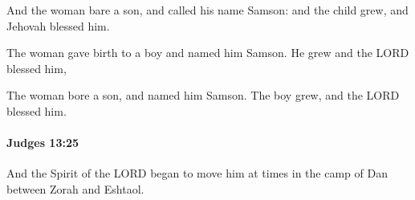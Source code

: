 			\begin{versebox}
					\item[BHS] 
					\item[ASV] And the woman bare a son, and called his name Samson: and the child grew, and Jehovah blessed him.
					\item[NIV] The woman gave birth to a boy and named him Samson. He grew and the LORD blessed him,
					\item[NRSV] The woman bore a son, and named him Samson. The boy grew, and the LORD blessed him.
			\end{versebox}

		\paragraph{Judges 13:25} %
			\label{JUDGES-13-25}

			And the Spirit of the LORD began to move him at times in the camp of Dan between Zorah and Eshtaol.

